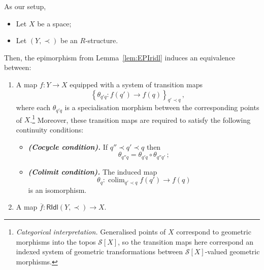 \documentclass[a4paper, 11pt,reqno]{amsart}
\newcommand{\baseS}{\mathcal{S}}
\newcommand{\RIdl}{\mathsf{RIdl}}
\DeclareMathOperator*{\colim}{colim}
\begin{document}
\begin{lemma}\label{lem:liftingsheaves} As our setup,
	
	\begin{itemize}
		\item Let $X$ be a space;
		\item Let $(Y,\prec)$ be an $R$-structure.
	\end{itemize}
	Then, the epimorphism from Lemma~\ref{lem:EPIridl}
	induces an equivalence between:
	\begin{enumerate}[label=(\roman*)]
		\item A map $f\colon Y\!\longrightarrow X$ equipped with a system of transition maps $$\left\{\theta_{q'q}\colon f(q')\rightarrow f(q) \right\}_{q'\prec q}\,,
	 $$
	 where each $\theta_{q'q}$ is a specialisation morphism between the corresponding points of $X$.\footnote{{\em Categorical interpretation.} Generalised points of $X$ correspond to geometric morphisms into the topos $\baseS[X]$, so the transition maps here correspond an indexed system of geometric transformations between $\baseS[X]$-valued geometric morphisms.}  Moreover, these transition maps are required to satisfy the following continuity conditions:
		\begin{itemize}
			
			\item \emph{{\bf (Cocycle condition).}} If $q''\prec q'\prec q$ then $$\theta_{q''q}=\theta_{q'q}\circ \theta_{q''q'}\,;$$
			\item \emph{{
				\bf (Colimit condition).}} The induced map $$\theta_{q}\colon\displaystyle\colim_{q'\prec q}f(q')\rightarrow f(q)$$ is an isomorphism. 
		\end{itemize}
		\item A map $\overline{f}\colon\RIdl(Y,\prec)\longrightarrow X$. 
	\end{enumerate}	
\end{lemma}

\end{document}
